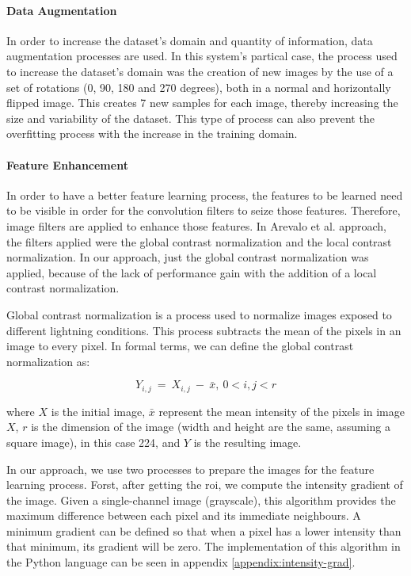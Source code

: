 \documentclass[
  twoside,
  11pt, a4paper,
  footinclude=true,
  headinclude=true,
  cleardoublepage=empty
]{scrbook}
\begin{document}
        \paragraph{Data Augmentation}
          In order to increase the dataset's domain and quantity of information, data augmentation processes are used. In this system's partical case, the process used to increase the dataset's domain was the creation of new images by the use of a set of rotations (0, 90, 180 and 270 degrees), both in a normal and horizontally flipped image. This creates 7 new samples for each image, thereby increasing the size and variability of the dataset. This type of process can also prevent the overfitting process with the increase in the training domain.

        \paragraph{Feature Enhancement}
          In order to have a better feature learning process, the features to be learned need to be visible in order for the convolution filters to seize those features. Therefore, image filters are applied to enhance those features. In Arevalo et al. \cite{arevalo2016representation} approach, the filters applied were the global contrast normalization and the local contrast normalization. In our approach, just the global contrast normalization was applied, because of the lack of performance gain with the addition of a local contrast normalization.

          Global contrast normalization is a process used to normalize images exposed to different lightning conditions. This process subtracts the mean of the pixels in an image to every pixel. In formal terms, we can define the global contrast normalization as:

          \begin{equation}
            Y_{i,j}\ =\ X_{i,j}\ -\ \bar{x},\ 0 < i,j < r
          \end{equation}

          where $X$ is the initial image, $\bar{x}$ represent the mean intensity of the pixels in image $X$, $r$ is the dimension  of the image (width and height are the same, assuming a square image), in this case 224, and $Y$ is the resulting image.

          In our approach, we use two processes to prepare the images for the feature learning process. Forst, after getting the \gls{roi}, we compute the intensity gradient of the image. Given a single-channel image (grayscale), this algorithm provides the maximum difference between each pixel and its immediate neighbours. A minimum gradient can be defined so that when a pixel has a lower intensity than that minimum, its gradient will be zero. The implementation of this algorithm in the Python language can be seen in appendix \ref{appendix:intensity-grad}.
\end{document}
